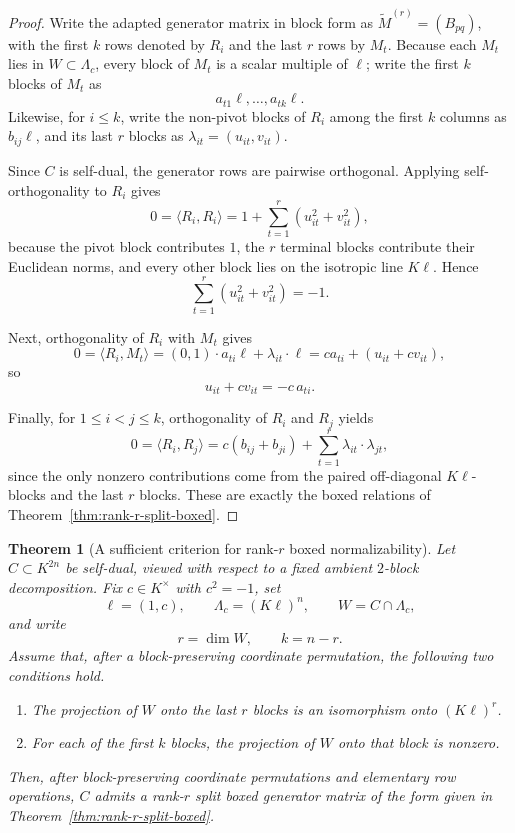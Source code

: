 \documentclass[12pt]{article}
\newtheorem{theorem}{Theorem}[section]
\begin{document}
\begin{proof}
Write the adapted generator matrix in block form as \(\widetilde M^{(r)}=(B_{pq})\), with the first \(k\) rows denoted by \(R_i\) and the last \(r\) rows by \(M_t\). Because each \(M_t\) lies in \(W\subset \Lambda_c\), every block of \(M_t\) is a scalar multiple of \(\ell\); write the first \(k\) blocks of \(M_t\) as
\[
a_{t1}\ell,\dots,a_{tk}\ell.
\]
Likewise, for \(i\le k\), write the non-pivot blocks of \(R_i\) among the first \(k\) columns as \(b_{ij}\ell\), and its last \(r\) blocks as \(\lambda_{it}=(u_{it},v_{it})\).

Since \(C\) is self-dual, the generator rows are pairwise orthogonal. Applying self-orthogonality to \(R_i\) gives
\[
0=\langle R_i,R_i\rangle
=
1+\sum_{t=1}^r (u_{it}^2+v_{it}^2),
\]
because the pivot block contributes \(1\), the \(r\) terminal blocks contribute their Euclidean norms, and every other block lies on the isotropic line \(K\ell\). Hence
\[
\sum_{t=1}^r (u_{it}^2+v_{it}^2)=-1.
\]

Next, orthogonality of \(R_i\) with \(M_t\) gives
\[
0=\langle R_i,M_t\rangle
=(0,1)\cdot a_{ti}\ell+\lambda_{it}\cdot \ell
=
ca_{ti}+(u_{it}+cv_{it}),
\]
so
\[
u_{it}+cv_{it}=-c\,a_{ti}.
\]

Finally, for \(1\le i<j\le k\), orthogonality of \(R_i\) and \(R_j\) yields
\[
0=\langle R_i,R_j\rangle
=
c(b_{ij}+b_{ji})+\sum_{t=1}^r \lambda_{it}\cdot\lambda_{jt},
\]
since the only nonzero contributions come from the paired off-diagonal \(K\ell\)-blocks and the last \(r\) blocks. These are exactly the boxed relations of Theorem~\ref{thm:rank-r-split-boxed}.
\end{proof}

\begin{theorem}[A sufficient criterion for rank-\texorpdfstring{$r$}{r} boxed normalizability]
\label{thm:sufficient-rank-r-boxed-normalizability}
Let \(C\subset K^{2n}\) be self-dual, viewed with respect to a fixed ambient \(2\)-block decomposition. Fix \(c\in K^\times\) with \(c^2=-1\), set
\[
\ell=(1,c),\qquad \Lambda_c=(K\ell)^n,\qquad W=C\cap \Lambda_c,
\]
and write
\[
r=\dim W,\qquad k=n-r.
\]
Assume that, after a block-preserving coordinate permutation, the following two conditions hold.
\begin{enumerate}
\item The projection of \(W\) onto the last \(r\) blocks is an isomorphism onto \((K\ell)^r\).
\item For each of the first \(k\) blocks, the projection of \(W\) onto that block is nonzero.
\end{enumerate}
Then, after block-preserving coordinate permutations and elementary row operations, \(C\) admits a rank-\(r\) split boxed generator matrix of the form given in Theorem~\ref{thm:rank-r-split-boxed}.
\end{theorem}
\end{document}

